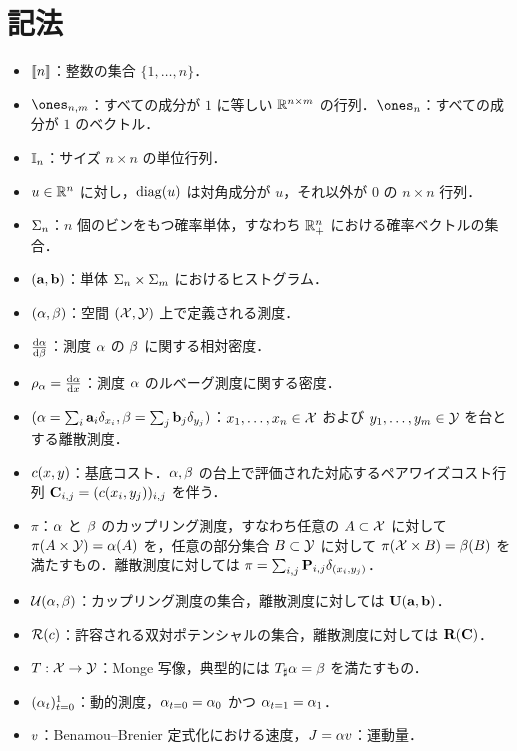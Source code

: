 \section*{記法}

\begin{itemize}
	\item $\range{n}$：整数の集合 $\{1,\dots,n\}$．
	\item $\ones_{n,m}$：すべての成分が $1$ に等しい $\RR^{n\times m}$ の行列．$\ones_{n}$：すべての成分が $1$ のベクトル．
	\item $\Identity_n$：サイズ $n\times n$ の単位行列．
	\item $u\in\RR^n$ に対し，$\diag(u)$ は対角成分が $u$，それ以外が $0$ の $n\times n$ 行列．
	\item $\simplex_n$：$n$ 個のビンをもつ確率単体，すなわち $\RR^n_+$ における確率ベクトルの集合．
	\item $(\a,\b)$：単体 $\simplex_n \times \simplex_m$ におけるヒストグラム．
	\item $(\al,\be)$：空間 $(\X,\Y)$ 上で定義される測度．
	\item $\frac{\d\al}{\d\be}$：測度 $\al$ の $\be$ に関する相対密度．
	\item $\density{\al} = \frac{\d\al}{\d x}$：測度 $\al$ のルベーグ測度に関する密度．
	\item $(\al=\sum_i \a_i \delta_{x_i},\be=\sum_j \b_j \delta_{y_j})$：$x_1,\dots,x_n\in\X$ および $y_1,\dots,y_m\in\Y$ を台とする離散測度．
	\item $\c(x,y)$：基底コスト．$\al,\be$ の台上で評価された対応するペアワイズコスト行列 $\C_{i,j}=(\c(x_i,y_j))_{i,j}$ を伴う．
	\item $\pi$：$\al$ と $\be$ のカップリング測度，すなわち任意の $A\subset\X$ に対して $\pi(A\times \Y)= \al(A)$ を，任意の部分集合 $B\subset \Y$ に対して $\pi(\X\times B)= \be(B)$ を満たすもの．離散測度に対しては $\pi = \sum_{i,j} \P_{i,j}\delta_{(x_i,y_j)}$．
	\item $\Couplings(\al,\be)$：カップリング測度の集合，離散測度に対しては $\CouplingsD(\a,\b)$．
	\item $\Potentials(\c)$：許容される双対ポテンシャルの集合，離散測度に対しては $\PotentialsD(\C)$．
	\item $\T : \X \rightarrow \Y$：Monge 写像，典型的には $\T_\sharp \al = \be$ を満たすもの．
	\item $(\al_t)_{t=0}^1$：動的測度，$\al_{t=0}=\al_0$ かつ $\al_{t=1}=\al_1$．
	\item $\speed$：Benamou--Brenier 定式化における速度，$\Moment=\al \speed$：運動量．

\end{itemize}
